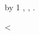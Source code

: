 \documentclass{article}
\begin{document}
\newcount\rowctr
\loop
  \advance\rowctr by 1\relax
  \dtlgetrow{\testdata}{\rowctr}%
  \Fieldi, \Fieldii, \Fieldiii.\par
\ifnum\rowctr<\DTLrowcount{\testdata}
\repeat
\end{document}
